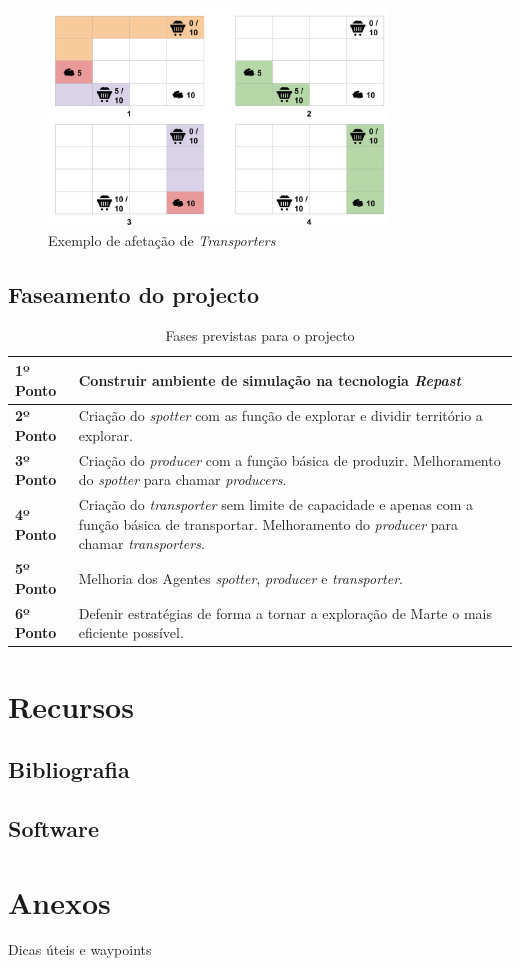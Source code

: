 \documentclass[12pt]{report}
\begin{document}
\begin{figure}[h]
  \centering
    \includegraphics[width=0.8\textwidth]{transporter-scheduling}
  \caption{\small{Exemplo de afetação de \textit{Transporters}}}
\end{figure}

\newpage
\section{Faseamento do projecto}

\begin{table}[htb]
\centering
\caption{Fases previstas para o projecto}
    \sffamily \begin{tabularx}{1.0\textwidth}{ p{3cm}  p{} }
    \hline
    \textbf{1º Ponto} \hfill & Construir ambiente de simulação na tecnologia \emph{Repast} \\ \hline
    \textbf{2º Ponto} \hfill & Criação do \emph{spotter} com as função de explorar e dividir território a explorar. \\ \hline
    \textbf{3º Ponto} \hfill & Criação do \emph{producer} com a função básica de produzir. Melhoramento do \emph{spotter} para chamar \emph{producers}. \\ \hline
    \textbf{4º Ponto} \hfill & Criação do \emph{transporter} sem limite de capacidade e apenas com a função básica de transportar. Melhoramento do \emph{producer} para chamar \emph{transporters}. \\ \hline
    \textbf{5º Ponto} \hfill & Melhoria dos Agentes \emph{spotter}, \emph{producer} e \emph{transporter}. \\ \hline
    \textbf{6º Ponto} \hfill & Defenir estratégias de forma a tornar a exploração de Marte o mais eficiente possível. \\ \hline
    \end{tabularx} \normalfont
\end{table}

\chapter{Recursos}
\section{Bibliografia}
\section{Software}

%
%
\appendix
\renewcommand{\chaptername}{Anexos}
\chapter{Anexos}
Dicas úteis e waypoints
\end{document}
